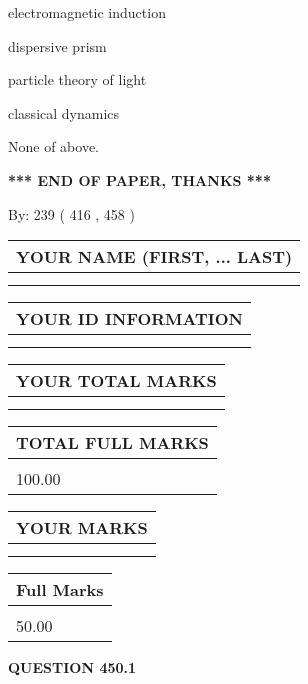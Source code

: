 \documentclass[12pt]{article}
\begin{document}
 
electromagnetic induction
 
 
dispersive prism
 
 
particle theory of light
 
 
classical dynamics
 
 
 None of above.
 
 
   
   
\vspace{1.0in} 
{\textbf{\large{ *** END OF PAPER, THANKS *** }}} 
   
   
\hspace{1.0in} By: 
 239 ( 416 ,  458 )
   
   
   
   
\newpage 
\setcounter{page}{ 
   450001 } 
   
   
   
   
\noindent\begin{tabular}{|l|}
\hline
YOUR NAME (FIRST, ... LAST)  \\
\hline
 \\ 
 \\ 
\hline
\end{tabular}
\hspace{0.05in} \begin{tabular}{|l|}
\hline
 YOUR   ID   INFORMATION  \\
\hline
 \\ 
 \\ 
\hline
\end{tabular}
   
   
\vspace{0.2in}\noindent\begin{tabular}{|l|}
\hline
YOUR TOTAL MARKS  \\
\hline
 \\ 
 \\ 
\hline
\end{tabular}
\hspace{0.05in} \begin{tabular}{|l|}
\hline
TOTAL FULL MARKS  \\
\hline
 \\ 
100.00 \\
\hline
\end{tabular}
  
\vspace{0.2in}
  
\noindent\begin{tabular}{|l|}
\hline
 YOUR MARKS  \\
\hline
 \\ 
 \\ 
\hline
\end{tabular}
\hspace{0.05in} \begin{tabular}{|l|}
\hline
 Full Marks  \\
\hline
 \\ 
50.00 \\
\hline
\end{tabular}
{\textbf{\Large{QUESTION
450.1 
}}}
  
\end{document}
